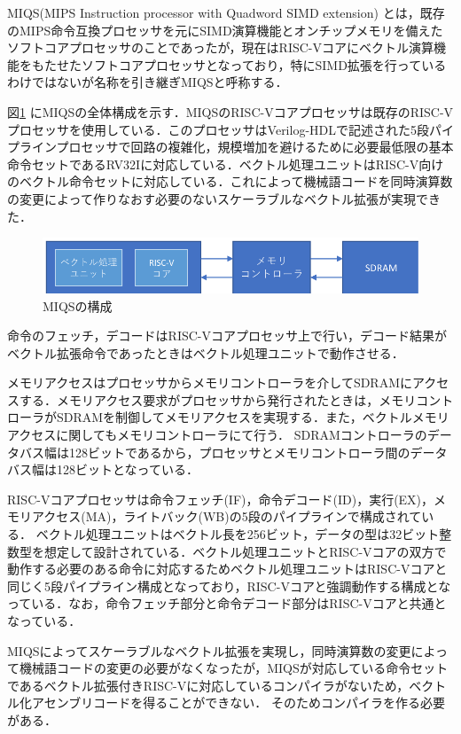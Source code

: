 MIQS(MIPS Instruction processor with Quadword SIMD extension)\cite{bib:hiraishi}
とは，既存のMIPS命令互換プロセッサを元にSIMD演算機能とオンチップメモリを備えたソフトコアプロセッサのことであったが，現在はRISC-Vコアにベクトル演算機能をもたせたソフトコアプロセッサとなっており，特にSIMD拡張を行っているわけではないが名称を引き継ぎMIQSと呼称する．

図\ref{fig:MIQS_system}
にMIQSの全体構成を示す．MIQSのRISC-Vコアプロセッサは既存のRISC-Vプロセッサを使用している．このプロセッサはVerilog-HDLで記述された5段パイプラインプロセッサで回路の複雑化，規模増加を避けるために必要最低限の基本命令セットであるRV32Iに対応している．ベクトル処理ユニットはRISC-V向けのベクトル命令セットに対応している．これによって機械語コードを同時演算数の変更によって作りなおす必要のないスケーラブルなベクトル拡張が実現できた．

\begin{figure}[tb]
\begin{center}
    \includegraphics[scale=1.0]{image/MIQS_system.pdf}
    \caption{MIQSの構成}
    \label{fig:MIQS_system}
\end{center}
\end{figure}

命令のフェッチ，デコードはRISC-Vコアプロセッサ上で行い，デコード結果がベクトル拡張命令であったときはベクトル処理ユニットで動作させる．

メモリアクセスはプロセッサからメモリコントローラを介してSDRAMにアクセスする．メモリアクセス要求がプロセッサから発行されたときは，メモリコントローラがSDRAMを制御してメモリアクセスを実現する．また，ベクトルメモリアクセスに関してもメモリコントローラにて行う．
SDRAMコントローラのデータバス幅は128ビットであるから，プロセッサとメモリコントローラ間のデータバス幅は128ビットとなっている．

RISC-Vコアプロセッサは命令フェッチ(IF)，命令デコード(ID)，実行(EX)，メモリアクセス(MA)，ライトバック(WB)の5段のパイプラインで構成されている．
ベクトル処理ユニットはベクトル長を256ビット，データの型は32ビット整数型を想定して設計されている．ベクトル処理ユニットとRISC-Vコアの双方で動作する必要のある命令に対応するためベクトル処理ユニットはRISC-Vコアと同じく5段パイプライン構成となっており，RISC-Vコアと強調動作する構成となっている．なお，命令フェッチ部分と命令デコード部分はRISC-Vコアと共通となっている．

MIQSによってスケーラブルなベクトル拡張を実現し，同時演算数の変更によって機械語コードの変更の必要がなくなったが，MIQSが対応している命令セットであるベクトル拡張付きRISC-Vに対応しているコンパイラがないため，ベクトル化アセンブリコードを得ることができない．
そのためコンパイラを作る必要がある．